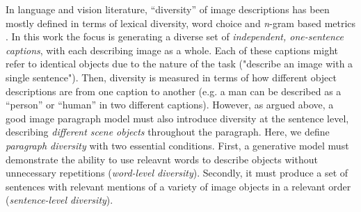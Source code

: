 \documentclass[11pt,a4paper]{article}
\begin{document}
In language and vision literature, ``diversity'' of image descriptions has been mostly defined in terms of lexical diversity, word choice and \textit{n}-gram based metrics \cite{Devlin2015, Vijayakumar2016, Lindh2018, VanMiltenburg2018}.
In this work the focus is generating a diverse set of \textit{independent, one-sentence captions}, with each describing image as a whole.
Each of these captions might refer to identical objects due to the nature of the task ("describe an image with a single sentence"). Then, diversity is measured in terms of how different object descriptions are from one caption to another (e.g. a man can be described as a ``person'' or ``human'' in two different captions).
However, as argued above, a good image paragraph model must also introduce diversity at the sentence level, describing \textit{different scene objects} throughout the paragraph. %
Here, we define \textit{paragraph diversity} with two essential conditions. First, a generative model must demonstrate the ability to use %
releavnt words to describe objects without unnecessary repetitions (\emph{word-level diversity}).
Secondly, it must produce a set of sentences with relevant mentions of a variety of image objects in a relevant order (\emph{sentence-level diversity}). 

\end{document}
